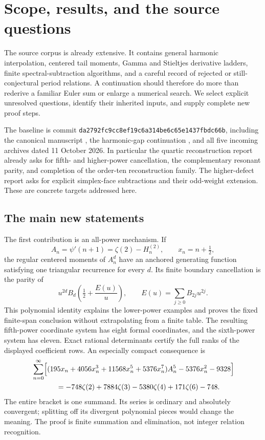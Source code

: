 \documentclass[11pt,a4paper]{article}
\numberwithin{equation}{section}
\theoremstyle{definition}
\theoremstyle{remark}
\begin{document}
\section{Scope, results, and the source questions}
\label{sec:scope}

The source corpus is already extensive. It contains general harmonic
interpolation, centered tail moments, Gamma and Stieltjes derivative
ladders, finite spectral-subtraction algorithms, and a careful record
of rejected or still-conjectural period relations. A continuation should
therefore do more than rederive a familiar Euler sum or enlarge a
numerical search. We select explicit unresolved questions, identify
their inherited inputs, and supply complete new proof steps.

The baseline is commit
\texttt{da2792fc9cc8ef19c6a314be6c65e1437fbdc66b}, including the canonical
manuscript \cite{RepoMain}, the harmonic-gap continuation
\cite{gm:gaps-source}, and all five incoming archives dated 11 October
2026. In particular the quartic reconstruction report \cite{RepoQuartic}
already asks for fifth- and higher-power cancellation, the complementary
resonant parity, and completion of the order-ten reconstruction family.
The higher-defect report \cite{sd:HigherDefects} asks for explicit
simplex-face subtractions and their odd-weight extension. These are
concrete targets addressed here.

\subsection{The main new statements}

The first contribution is an all-power mechanism. If
\[
 A_n=\psi'(n+1)=\zeta(2)-H_n^{(2)},\qquad x_n=n+\tfrac12,
\]
the regular centered moments of $A_n^d$ have an anchored generating
function satisfying one triangular recurrence for every $d$. Its finite
boundary cancellation is the parity of
\[
 u^{2d}B_d\!\left(\tfrac12+\frac{E(u)}u\right),
 \qquad E(u)=\sum_{j\ge0}B_{2j}u^{2j}.
\]
This polynomial identity explains the lower-power examples and proves
the fixed finite-span conclusion without extrapolating from a finite
table. The resulting fifth-power coordinate system has eight formal
coordinates, and the sixth-power system has eleven. Exact rational
determinants certify the full ranks of the displayed coefficient rows.
An especially compact consequence is
\begin{equation}\label{intro:quintic}
\begin{split}
&\sum_{n=0}^{\infty}\Bigl[
 (195x_n+4056x_n^3+11568x_n^5+5376x_n^7)A_n^5
                  -5376x_n^2-9328\Bigr]\\
&\hspace{12mm}=-748\zeta(2)+7884\zeta(3)-5380\zeta(4)
                                    +171\zeta(6)-748.
\end{split}
\end{equation}
The entire bracket is one summand. Its series is ordinary and absolutely
convergent; splitting off its divergent polynomial pieces would change
the meaning. The proof is finite summation and elimination, not integer
relation recognition.
\end{document}
